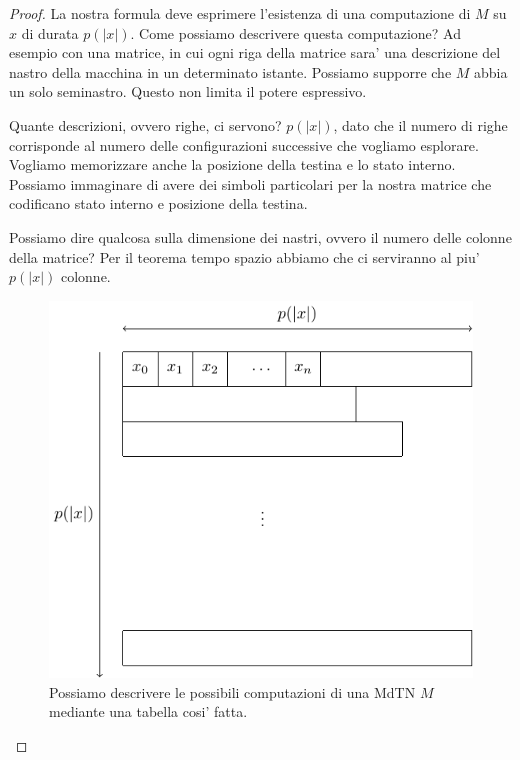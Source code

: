 \begin{proof}
    La nostra formula deve esprimere l'esistenza di una computazione di $M$ su $x$ di durata
    $p(|x|)$. Come possiamo descrivere questa computazione? Ad esempio con una matrice, in cui ogni
    riga della matrice sara' una descrizione del nastro della macchina in un determinato istante.
    Possiamo supporre che $M$ abbia un solo seminastro. Questo non limita il potere espressivo.

    Quante descrizioni, ovvero righe, ci servono? $p(|x|)$, dato che il numero di righe corrisponde
    al numero delle configurazioni successive che vogliamo esplorare. Vogliamo memorizzare anche la
    posizione della testina e lo stato interno. Possiamo immaginare di avere dei simboli particolari
    per la nostra matrice che codificano stato interno e posizione della testina.

    Possiamo dire qualcosa sulla dimensione dei nastri, ovvero il numero delle colonne della
    matrice?  Per il teorema tempo spazio abbiamo che ci serviranno al piu' $p(|x|)$ colonne.

    \begin{figure}[h]
        \begin{center}
            \includegraphics{./img/NPClass/SATproof1.pdf}
            \caption{Possiamo descrivere le possibili computazioni di una MdTN $M$ mediante una
            tabella cosi' fatta.}
        \end{center}
    \end{figure}


\end{proof}
